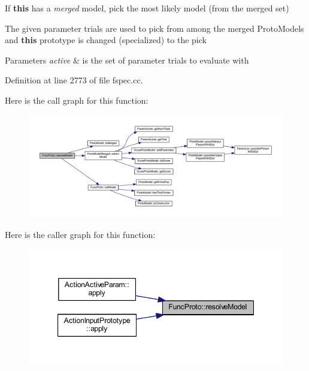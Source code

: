 If {\bfseries{this}} has a {\itshape merged} model, pick the most likely model (from the merged set) 

The given parameter trials are used to pick from among the merged Proto\+Models and {\bfseries{this}} prototype is changed (specialized) to the pick 
\begin{DoxyParams}{Parameters}
{\em active} & is the set of parameter trials to evaluate with \\
\hline
\end{DoxyParams}


Definition at line 2773 of file fspec.\+cc.

Here is the call graph for this function\+:
\nopagebreak
\begin{figure}[H]
\begin{center}
\leavevmode
\includegraphics[width=350pt]{class_func_proto_afd3b71963b55dd19755eeaccd016c4bf_cgraph}
\end{center}
\end{figure}
Here is the caller graph for this function\+:
\nopagebreak
\begin{figure}[H]
\begin{center}
\leavevmode
\includegraphics[width=347pt]{class_func_proto_afd3b71963b55dd19755eeaccd016c4bf_icgraph}
\end{center}
\end{figure}
\mbox{\label{class_func_proto_a4c4f9da74ee904e6abfa195bd843521e}} 
